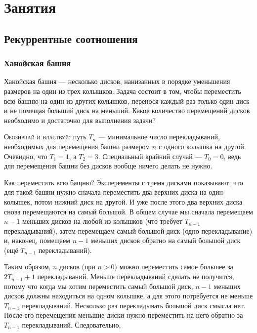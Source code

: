 \documentclass[14pt,openany]{book}
\begin{document}
\begingroup
\hypersetup{linkcolor=black}
\tableofcontents
\endgroup

\clearpage

\part{Занятия}

\chapter{Рекуррентные соотношения}

\section{Ханойская башня}

Ханойская башня --- несколько дисков, нанизанных в порядке уменьшения размеров на один из
трех колышков. Задача состоит в том, чтобы переместить всю башню на один из других колышков,
перенося каждый раз только один диск и не помещая больший диск на меньший.
Какое количество перемещений дисков необходимо и достаточно для выполнения задачи?

\textsc{Обозначай и властвуй}: путь $T_n$ --- минимальное число перекладываний, необходимых
для перемещения башни размером $n$ с одного колышка на другой. Очевидно, что $T_1=1$, а $T_2=3$.
Специальный крайний случай --- $T_0=0$, ведь для перемещения башни без дисков вообще ничего делать
не нужно.

Как переместить всю бащню? Эксперементы с тремя дисками показывают, что для такой башни нужно 
сначала переместить два верхних диска на один колышек, потом нижний диск на другой. И уже 
после этого два верхних диска снова перемещаются на самый большой. В общем случае мы сначала
перемещаем $n-1$ меньших дисков на любой из колышков (что требует $T_{n-1}$ перекладываний),
затем перемещаем самый большой диск (одно перекладывание) и, наконец, помещаем $n-1$
меньших дисков обратно на самый большой диск (ещё $T_{n-1}$ перекладываний). 

Таким образом, $n$ дисков (при $n>0$) можно переместить самое большее за $2T_{n-1}+1$
перекладываний. Меньше перекладываний сделать не получится, потому что когда мы хотим
переместить самый большой диск, $n-1$ меньших дисков должны находиться на одном колышке,
а для этого потребуется не меньше $T_{n-1}$ перекладываний.
Несколько раз перекладывать большой диск смысла нет. После его перемещения меньшие диски нужно
переместить на него обратно за $T_{n-1}$ перекладываний. Следовательно,
\end{document}
